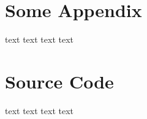 \chapter{Some Appendix}
\label{sec:Appendix}

text text text text

\chapter{Source Code}
\label{sub:appendixA}

text text text text

